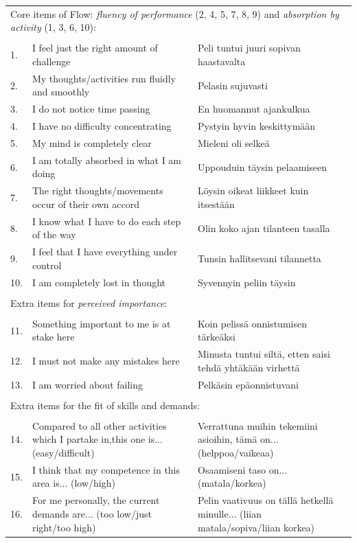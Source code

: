 \documentclass[fleqn,10pt]{wlscirep}
\begin{document}
\begin{table}[h]
\begin{tabular}{l p{} p{}}
\multicolumn{3}{l}{Core items of Flow: {\it fluency of performance} (2, 4, 5, 7, 8, 9) and {\it absorption by activity} (1, 3, 6, 10):} \\
\\
1. & I feel just the right amount of challenge    &    Peli tuntui juuri sopivan haastavalta  \\
2. & My thoughts/activities run fluidly and smoothly   & Pelasin sujuvasti \\
3. & I do not notice time passing  & En huomannut ajankulkua \\
4. & I have no difficulty concentrating & Pystyin hyvin keskittym\"{a}\"{a}n \\
5. & My mind is completely clear & Mieleni oli selke\"{a} \\
6. & I am totally absorbed in what I am doing & Uppouduin t\"{a}ysin pelaamiseen \\
7. & The right thoughts/movements occur of their own accord & L\"{o}ysin oikeat liikkeet kuin itsest\"{a}\"{a}n \\
8. & I know what I have to do each step of the way & Olin koko ajan tilanteen tasalla \\
9. & I feel that I have everything under control & Tunsin hallitsevani tilannetta \\
10. & I am completely lost in thought & Syvennyin peliin t\"{a}ysin  \\
\\
\multicolumn{3}{l}{Extra items for {\it perceived importance}:} \\
\\
11. & Something important to me is at stake here & Koin peliss\"{a} onnistumisen t\"{a}rke\"{a}ksi \\
12. & I must not make any mistakes here & Minusta tuntui silt\"{a}, etten saisi tehd\"{a} yht\"{a}k\"{a}\"{a}n virhett\"{a}\\
13. & I am worried about failing & Pelk\"{a}sin ep\"{a}onnistuvani\\
\\
\multicolumn{3}{l}{Extra items for the fit of skills and demands:} \\
\\
14. & Compared to all other activities which I partake in,this one is... (easy/difficult) & Verrattuna muihin tekemiini asioihin, t\"{a}m\"{a} on... (helppoa/vaikeaa) \\
15. & I think that my competence in this area is... (low/high)  & Osaamiseni taso on... (matala/korkea)\\
16. & For me personally, the current demands are... (too low/just right/too high) & Pelin vaativuus on t\"{a}ll\"{a} hetkell\"{a} minulle... (liian matala/sopiva/liian korkea)\\
\end{tabular}
\end{table}
\end{document}
